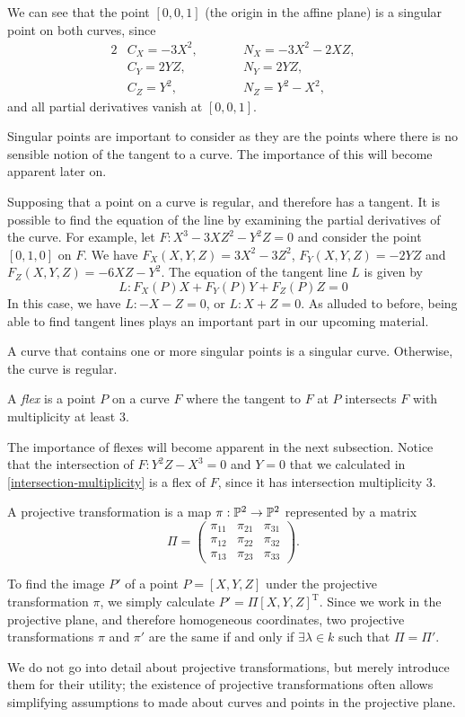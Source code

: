 We can see that the point $[0,0,1]$ (the origin in the affine plane) is a singular point on both curves, since
\begin{alignat*}{2}
	&C_X = -3X^2,\qquad &&N_X = - 3X^2 - 2XZ,\\
	&C_Y = 2YZ,\qquad &&N_Y = 2YZ,\\
	&C_Z = Y^2,\qquad &&N_Z = Y^2 -X^2,
\end{alignat*}
and all partial derivatives vanish at $[0,0,1]$.

Singular points are important to consider as they are the points where there is no sensible notion of the tangent to a curve.
The importance of this will become apparent later on.

Supposing that a point on a curve is regular, and therefore has a tangent.
It is possible to find the equation of the line by examining the partial derivatives of the curve.
For example, let $F: X^3 - 3XZ^2 - Y^2Z = 0$ and consider the point $[0,1,0]$ on $F$.
We have $F_X(X,Y,Z) = 3X^2 -3Z^2$, $F_Y(X,Y,Z) = -2YZ$ and $F_Z(X,Y,Z) = -6XZ - Y^2$.
The equation of the tangent line $L$ is given by
$$L : F_X(P)X + F_Y(P)Y + F_Z(P)Z = 0$$
In this case, we have $L : -X - Z = 0$, or $L: X + Z = 0$.
As alluded to before, being able to find tangent lines plays an important part in our upcoming material.

\begin{definition}
	A curve that contains one or more singular points is a singular curve.
	Otherwise, the curve is regular.
\end{definition}

\begin{definition}
	A \emph{flex} is a point $P$ on a curve $F$ where the tangent to $F$ at $P$ intersects $F$ with multiplicity at least 3.
\end{definition}

The importance of flexes will become apparent in the next subsection.
Notice that the intersection of $F : Y^2Z - X^3 = 0$ and $Y=0$ that we calculated in \cref{intersection-multiplicity} is a flex of $F$, since it has intersection multiplicity 3.
\begin{definition}
	A projective transformation is a map $\pi : \pn[2] \rightarrow \pn[2]$ represented by a matrix
	$$\Pi = \left(
		\begin{matrix}
			\pi_{11} & \pi_{21} & \pi_{31}\\
			\pi_{12} & \pi_{22} & \pi_{32}\\
			\pi_{13} & \pi_{23} & \pi_{33}
		\end{matrix}
	\right).
	$$
\end{definition}
To find the image $P'$ of a point $P = [X,Y,Z]$ under the projective transformation $\pi$, we simply calculate $P' = \Pi [X,Y,Z]^{\mathrm{T}}$.
Since we work in the projective plane, and therefore homogeneous coordinates, two projective transformations $\pi$ and $\pi'$ are the same if and only if $\exists\lambda\in k$ such that $\Pi = \Pi'$.

We do not go into detail about projective transformations, but merely introduce them for their utility; the existence of projective transformations often allows simplifying assumptions to made about curves and points in the projective plane.
